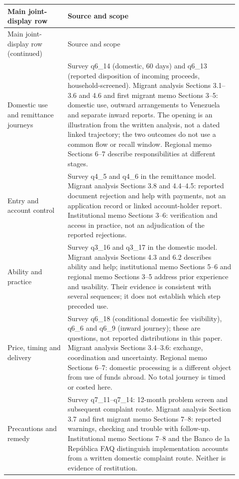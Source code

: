{\small\begin{singlespace}
\begin{longtable}{@{}
  >{\raggedright\arraybackslash}p{0.24\linewidth}
  >{\raggedright\arraybackslash}p{0.68\linewidth}@{}}
\toprule
Main joint-display row & Source and scope \\
\midrule
\endfirsthead
\toprule
Main joint-display row (continued) & Source and scope \\
\midrule
\endhead
\bottomrule
\endlastfoot
Domestic use and remittance journeys & Survey q6\_14 (domestic, 60 days) and q6\_13 (reported disposition of incoming proceeds, household-screened). Migrant analysis Sections 3.1--3.6 and 4.6 and first migrant memo Sections 3--5: domestic use, outward arrangements to Venezuela and separate inward reports. The opening is an illustration from the written analysis, not a dated linked trajectory; the two outcomes do not use a common flow or recall window. Regional memo Sections 6--7 describe responsibilities at different stages. \\
Entry and account control & Survey q4\_5 and q4\_6 in the remittance model. Migrant analysis Sections 3.8 and 4.4--4.5: reported document rejection and help with payments, not an application record or linked account-holder report. Institutional memo Sections 3--6: verification and access in practice, not an adjudication of the reported rejections. \\
Ability and practice & Survey q3\_16 and q3\_17 in the domestic model. Migrant analysis Sections 4.3 and 6.2 describes ability and help; institutional memo Sections 5--6 and regional memo Sections 3--5 address prior experience and usability. Their evidence is consistent with several sequences; it does not establish which step preceded use. \\
Price, timing and delivery & Survey q6\_18 (conditional domestic fee visibility), q6\_6 and q6\_9 (inward journey); these are questions, not reported distributions in this paper. Migrant analysis Sections 3.4--3.6: exchange, coordination and uncertainty. Regional memo Sections 6--7: domestic processing is a different object from use of funds abroad. No total journey is timed or costed here. \\
Precautions and remedy & Survey q7\_11--q7\_14: 12-month problem screen and subsequent complaint route. Migrant analysis Section 3.7 and first migrant memo Sections 7--8: reported warnings, checking and trouble with follow-up. Institutional memo Sections 7--8 and the Banco de la República FAQ \citep{banrepfaq} distinguish implementation accounts from a written domestic complaint route. Neither is evidence of restitution. \\

\end{longtable}
\end{singlespace}}
